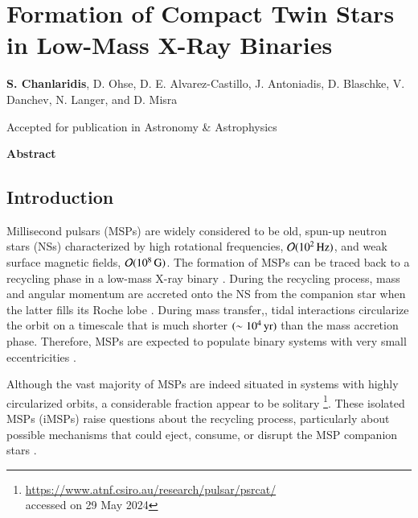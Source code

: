 \documentclass[main.tex]{subfiles}
\begin{document}
    \chapter[Formation of Compact Twin Stars in Low-Mass X-Ray Binaries]{Formation of Compact Twin Stars in Low-Mass X-Ray Binaries}


    \begin{center}
        \textbf{S. Chanlaridis}, D. Ohse, D. E. Alvarez-Castillo, J. Antoniadis, D. Blaschke, V. Danchev, N. Langer, and D. Misra   \\

        \vspace{0.5cm}

        Accepted for publication in Astronomy \& Astrophysics
    \end{center}
        
        
    \begin{center}
        \textbf{\large Abstract}
    \end{center}
    
    {
        \minitoc
        \newpage
    }
    
    \section{Introduction} \label{sec:intro}
        Millisecond pulsars (MSPs) are widely considered to be old, spun-up neutron stars (NSs) characterized by high rotational frequencies, $\mathcal{O}(10^2\,\rm Hz)$, and weak surface magnetic fields, $\mathcal{O}(10^8\,\rm G)$. The formation of MSPs can be traced back to a recycling
        phase in a low-mass X-ray binary \citep[LMXB; see][]{Tauris:2023nmj}. 
        During the recycling process,  mass and angular momentum are accreted onto the NS from the companion star when the latter fills its Roche lobe \citep[e.g.,][and references therein]{Bhattacharya:1991pre, Tauris:aap1999, Tauris:2023nmj}. During mass transfer,, tidal interactions circularize the orbit on a timescale that is much shorter $(\sim 10^4\,\rm yr)$ than the  mass accretion phase. Therefore, MSPs are expected to populate binary systems with very small eccentricities \citep{Phinney:1992, Verbunt:aa1995}.
        
        Although the vast majority of MSPs are indeed situated in systems with highly circularized orbits, a considerable fraction  appear to be solitary \citep[$\sim 27$\% among known MSPs with spin periods $\leq 30$\,ms; see the ATNF pulsar catalogue;][]{Manchester_2005}\footnote{\url{https://www.atnf.csiro.au/research/pulsar/psrcat/}\\ accessed on 29 May 2024}. These isolated MSPs (iMSPs) raise questions about the recycling process, particularly about possible mechanisms that could eject, consume, or disrupt the MSP companion stars \citep{1987Natur.329..312V, 2019PASA...36....5S, 2019JApA...40...32N, 2020A&A...633A..45J}. 
        
\end{document}
